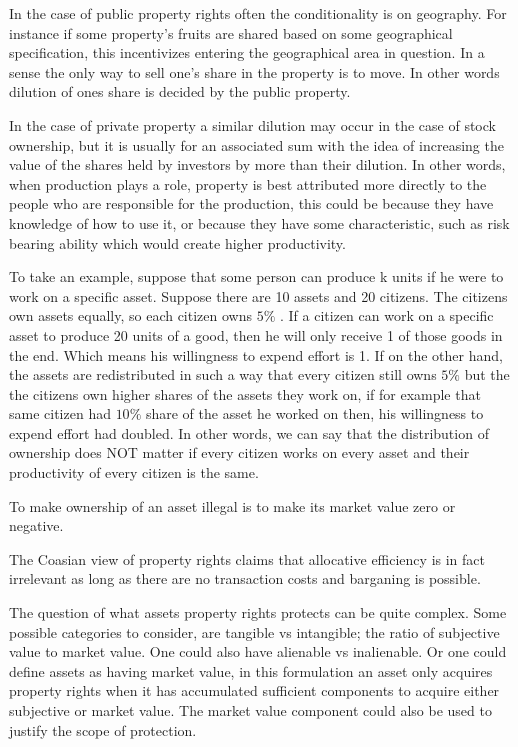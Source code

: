 \documentclass[12pt]{article}
\numberwithin{equation}{section}
\begin{document}
In the case of public property rights often the conditionality is on geography. For instance if some property's fruits are shared based on some geographical specification, this incentivizes entering the geographical area in question. In a sense the only way to sell one's share in the property is to move. In other words dilution of ones share is decided by the public property. 

In the case of private property a similar dilution may occur in the case of stock ownership, but it is usually for an associated sum with the idea of increasing the value of the shares held by investors by more than their dilution. In other words, when production plays a role, property is best attributed more directly to the people who are responsible for the production, this could be because they have knowledge of how to use it, or because they have some characteristic, such as risk bearing ability which would create higher productivity. 

To take an example, suppose that some person can produce k units if he were to work on a specific asset. Suppose there are 10 assets and 20 citizens. The citizens own assets equally, so each citizen owns $5 \%$ . If a citizen can work on a specific asset to produce 20 units of a good, then he will only receive 1 of those goods in the end. Which means his willingness to expend effort is 1. If on the other hand, the assets are redistributed in such a way that every citizen still owns $5 \%$ but the the citizens own higher shares of the assets they work on, if for example that same citizen had $10\%$ share of the asset he worked on then, his willingness to expend effort had doubled. In other words, we can say that the distribution of ownership does NOT matter if every citizen works on every asset and their productivity of every citizen is the same. 



To make ownership of an asset illegal is to make its market value zero or negative. 

The Coasian view of property rights claims that allocative efficiency is in fact irrelevant as long as there are no transaction costs and barganing is possible. 

The question of what assets property rights protects can be quite complex. Some possible categories to consider, are tangible vs intangible; the ratio of subjective value to market value. One could also have alienable vs inalienable. Or one could define assets as having market value, in this formulation an asset only acquires property rights when it has accumulated sufficient components to acquire either subjective or market value. The market value component could also be used to justify the scope of protection. 
\end{document}
